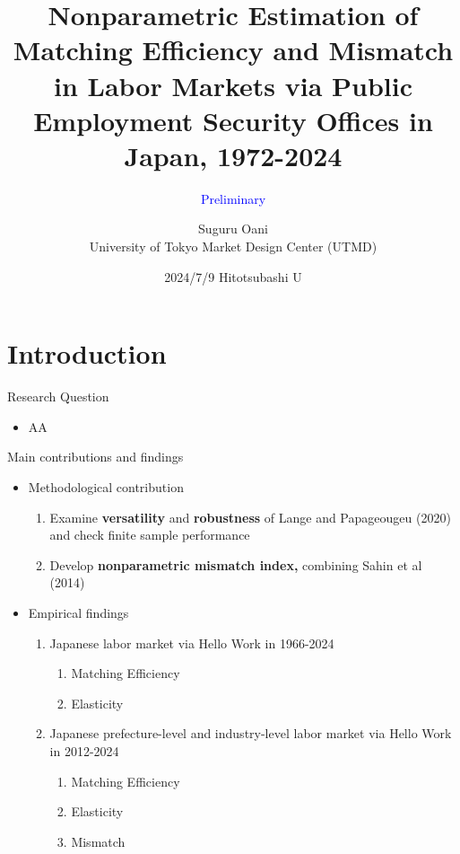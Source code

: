 \documentclass[aspectratio=169]{beamer}
\title{Nonparametric Estimation of Matching Efficiency and Mismatch in Labor Markets via Public Employment Security Offices in Japan, 1972-2024}
\date{2024/7/9 Hitotsubashi U}
\subtitle{\textcolor{blue}{Preliminary}}
\author{Suguru Oani\\ University of Tokyo Market Design Center (UTMD)}
\begin{document}
\maketitle

\section{Introduction}
\begin{frame}{Research Question}
\begin{itemize}
    \item AA
\end{itemize}
\end{frame}

\begin{frame}{Main contributions and findings}
\begin{itemize}
    \item Methodological contribution
    \begin{enumerate}
        \item Examine \textbf{versatility} and \textbf{robustness} of Lange and Papageougeu (2020) and check finite sample performance
        \item Develop \textbf{nonparametric mismatch index,} combining Sahin et al (2014)
    \end{enumerate}
    \item Empirical findings
    \begin{enumerate}
        \item Japanese labor market via Hello Work in 1966-2024
        \begin{enumerate}
            \item Matching Efficiency
            \item Elasticity
        \end{enumerate}
        \item Japanese prefecture-level and industry-level labor market via Hello Work in 2012-2024
        \begin{enumerate}
            \item Matching Efficiency
            \item Elasticity
            \item Mismatch
        \end{enumerate}
    \end{enumerate}
    
\end{itemize}
\end{frame}
\end{document}
